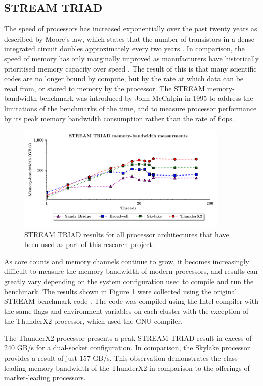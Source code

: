 \documentclass[a4paper,11pt]{report}
\begin{document}
\subsection{STREAM TRIAD}
The speed of processors has increased exponentially over the past twenty years as described by Moore's law, which states that the number of transistors in a dense integrated circuit doubles approximately every two years  \cite{moore1965cramming}. In comparison, the speed of memory has only marginally improved as manufacturers have historically prioritised memory capacity over speed \cite{mccalpin1995memory,patterson1997case}. The result of this is that many scientific codes are no longer bound by compute, but by the rate at which data can be read from, or stored to memory by the processor. The STREAM memory-bandwidth benchmark was introduced by John McCalpin in 1995 to address the limitations of the benchmarks of the time, and to measure processor performance by its peak memory bandwidth consumption rather than the rate of \gls{flops}.
\begin{figure}[htbp]
\begin{center}
\includegraphics[width=0.9\textwidth]{img/stream-triad.pdf}
\caption[STREAM TRIAD benchmark]{STREAM TRIAD results for all processor architectures that have been used as part of this research project. }
\label{fig:bandwidth}
\end{center}
\end{figure}
\par 
As core counts and memory channels continue to grow, it becomes increasingly difficult to measure the memory bandwidth of modern processors, and results can greatly vary depending on the system configuration used to compile and run the benchmark. The results shown in Figure \ref{fig:bandwidth} were collected using the original STREAM benchmark code \cite{stream2019github}. The code was compiled using the Intel compiler with the same flags and environment variables on each cluster with the exception of the ThunderX2 processor, which used the GNU compiler. 
\par
The ThunderX2 processor presents a peak STREAM TRIAD result in excess of 240 GB/s for a dual-socket configuration. In comparison, the Skylake processor provides a result of just 157 GB/s. This observation demonstrates the class leading memory bandwidth of the ThunderX2 in comparison to the offerings of market-leading processors.
\end{document}
